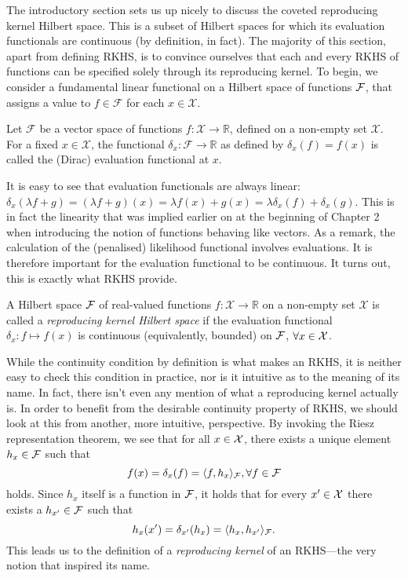 The introductory section sets us up nicely to discuss the coveted reproducing kernel Hilbert space.
This is a subset of Hilbert spaces for which its evaluation functionals are continuous (by definition, in fact).
The majority of this section, apart from defining RKHS, is to convince ourselves that each and every RKHS of functions can be specified solely through its reproducing kernel.
To begin, we consider a fundamental linear functional on a Hilbert space of functions ${\mathcal F}$, that assigns a value to $f \in \mathcal F$ for each $x \in \mathcal X$.

\begin{definition}
	Let $\mathcal F$ be a vector space of functions $f:\mathcal X \rightarrow \mathbb R$, defined on a non-empty set $\mathcal X$. 
	For a fixed $x \in \mathcal X$, the functional $\delta_x:\mathcal F \rightarrow \mathbb R$ as defined by $\delta_x(f) = f(x)$ is called the (Dirac) evaluation functional at $x$.
\end{definition}

It is easy to see that evaluation functionals are always linear: $\delta_x(\lambda f + g) = (\lambda f + g)(x) = \lambda f(x) + g(x) = \lambda\delta_x(f) + \delta_x(g)$.
This is in fact the linearity that was implied earlier on at the beginning of Chapter 2 when introducing the notion of functions behaving like vectors.
As a remark, the calculation of the (penalised) likelihood functional involves evaluations. 
It is therefore important for the evaluation functional to be continuous.
It turns out, this is exactly what RKHS provide.

\begin{definition}\label{def:rkhs}
	A Hilbert space ${\mathcal F}$ of real-valued functions $f:\mathcal X \rightarrow \mathbb R$ on a non-empty set $\mathcal X$ is called a \emph{reproducing kernel Hilbert space} if the evaluation functional $\delta_x: f \mapsto f(x)$ is continuous (equivalently, bounded) on ${\mathcal F}$, $\forall x \in {\mathcal X}$. 
\end{definition}

While the continuity condition by definition is what makes an RKHS, it is neither easy to check this condition in practice, nor is it intuitive as to the meaning of its name.
In fact, there isn't even any mention of what a reproducing kernel actually is.
In order to benefit from the desirable continuity property of RKHS, we should look at this from another, more intuitive, perspective. 
By invoking the Riesz representation theorem, we see that for all $x\in{\mathcal X}$, there exists a unique element $h_x\in{\mathcal F}$ such that
\[
  f(x) = \delta_x(f) = \langle f,h_x\rangle_{\mathcal F}, \forall f \in {\mathcal F}
\]
holds. 
Since $h_x$ itself is a function in ${\mathcal F}$, it holds that for every $x' \in {\mathcal X}$ there exists a $h_{x'}\in{\mathcal F}$ such that
\[
  h_{x}(x') = \delta_{x'}(h_{x}) = \langle h_x,h_{x'}\rangle_{\mathcal F}.
\]
This leads us to the definition of a \emph{reproducing kernel} of an RKHS---the very notion that inspired its name.

